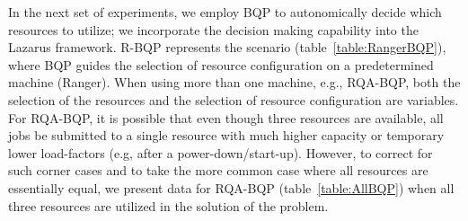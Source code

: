 \documentclass{acm_proc_article-sp}
\begin{document}
\begin{table}
\begin{center}
\vspace{0.2in}
\caption{Table showing the configurations chosen
  on Ranger, with and without BQP. Notice how the use
  of BQP has a small, but significant change in the queue, size and duration
  requested.} \label{table:RangerBQP}

\end{center}
\end{table}

In the next set of experiments, we employ BQP to autonomically decide
which resources to utilize; we incorporate the decision making
capability into the Lazarus framework.  R-BQP represents the scenario
(table~\ref{table:RangerBQP}), where BQP guides the selection of
resource configuration on a predetermined machine (Ranger).  When
using more than one machine, e.g.,
RQA-BQP, %
both the selection of the resources and the selection of resource
configuration are variables. For RQA-BQP, it is possible that even
though three resources are available, all jobs be submitted to a
single resource with much higher capacity or temporary lower
load-factors (e.g, after a power-down/start-up). However, to correct
for such corner cases and to take the more common case where all
resources are essentially equal, we present data for RQA-BQP
(table~\ref{table:AllBQP}) when all three resources are utilized in
the solution of the problem.
\end{document}
